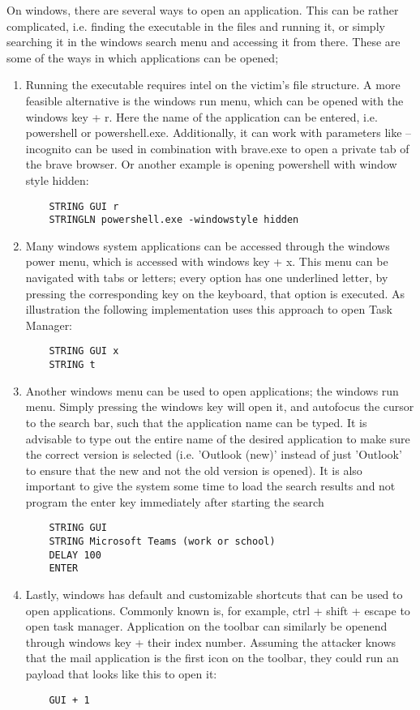 On windows, there are several ways to open an application. This can be rather complicated, i.e. finding the executable in the files and running it, or simply searching it in the windows search menu and accessing it from there. These are some of the ways in which applications can be opened;
\begin{enumerate}
    \item Running the executable requires intel on the victim's file structure. A more feasible alternative is the windows run menu, which can be opened with the windows key + r. Here the name of the application can be entered, i.e. powershell or powershell.exe. Additionally, it can work with parameters like --incognito can be used in combination with brave.exe to open a private tab of the brave browser. Or another example is opening powershell with window style hidden:
    \begin{lstlisting}
    STRING GUI r
    STRINGLN powershell.exe -windowstyle hidden
    \end{lstlisting}
    \item Many windows system applications can be accessed through the windows power menu, which is accessed with windows key + x. This menu can be navigated with tabs or letters; every option has one underlined letter, by pressing the corresponding key on the keyboard, that option is executed. As illustration the following implementation uses this approach to open Task Manager:
    \begin{lstlisting}
    STRING GUI x
    STRING t
    \end{lstlisting}
    \item Another windows menu can be used to open applications; the windows run menu. Simply pressing the windows key will open it, and autofocus the cursor to the search bar, such that the application name can be typed. It is advisable to type out the entire name of the desired application to make sure the correct version is selected (i.e. 'Outlook (new)' instead of just 'Outlook' to ensure that the new and not the old version is opened). It is also important to give the system some time to load the search results and not program the enter key immediately after starting the search
    \begin{lstlisting}
    STRING GUI
    STRING Microsoft Teams (work or school)
    DELAY 100
    ENTER
    \end{lstlisting}
    \item Lastly, windows has default and customizable shortcuts that can be used to open applications. Commonly known is, for example, ctrl + shift + escape to open task manager. Application on the toolbar can similarly be openend through windows key + their index number. Assuming the attacker knows that the mail application is the first icon on the toolbar, they could run an payload that looks like this to open it:
    \begin{lstlisting}
    GUI + 1
    \end{lstlisting}
\end{enumerate}

